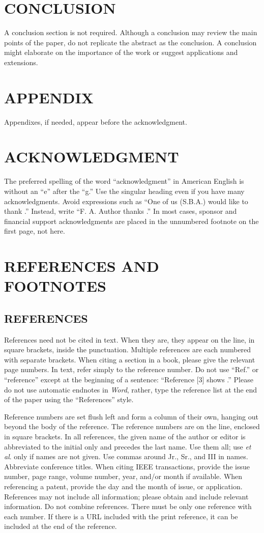 \documentclass{IEEEoj-data}
\begin{document}
{\section*{CONCLUSION}
A conclusion section is not required. Although a conclusion may review the 
main points of the paper, do not replicate the abstract as the conclusion. A 
conclusion might elaborate on the importance of the work or suggest 
applications and extensions.

\section*{APPENDIX}
Appendixes, if needed, appear before the acknowledgment.

\section*{ACKNOWLEDGMENT}
The preferred spelling of the word ``acknowledgment'' in American English is 
without an ``e'' after the ``g.'' Use the singular heading even if you have 
many acknowledgments. Avoid expressions such as ``One of us (S.B.A.) would 
like to thank \textellipsis .'' Instead, write ``F. A. Author thanks \textellipsis .'' In most 
cases, sponsor and financial support acknowledgments are placed in the 
unnumbered footnote on the first page, not here.

\section*{REFERENCES AND FOOTNOTES}
\subsection*{REFERENCES}
References need not be cited in text. When they are, they appear on the 
line, in square brackets, inside the punctuation. Multiple references are 
each numbered with separate brackets. When citing a section in a book, 
please give the relevant page numbers. In text, refer simply to the 
reference number. Do not use ``Ref.'' or ``reference'' except at the 
beginning of a sentence: ``Reference [3] shows \textellipsis .'' Please do not use 
automatic endnotes in \textit{Word}, rather, type the reference list at the end of the 
paper using the ``References'' style.

Reference numbers are set flush left and form a column of their own, hanging 
out beyond the body of the reference. The reference numbers are on the line, 
enclosed in square brackets. In all references, the given name of the author 
or editor is abbreviated to the initial only and precedes the last name. Use 
them all; use \textit{et al}. only if names are not given. Use commas around Jr., Sr., and 
III in names. Abbreviate conference titles. When citing IEEE transactions, 
provide the issue number, page range, volume number, year, and/or month if 
available. When referencing a patent, provide the day and the month of 
issue, or application. References may not include all information; please 
obtain and include relevant information. Do not combine references. There 
must be only one reference with each number. If there is a URL included with 
the print reference, it can be included at the end of the reference. 

}
\end{document}
